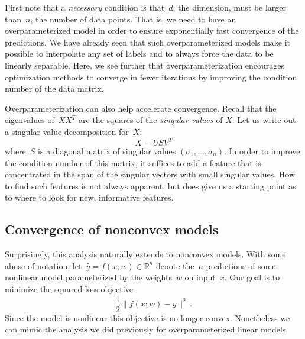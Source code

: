 \documentclass{tufte-book}
\begin{document}
First note that a \emph{necessary} condition is that~\(d\), the
dimension, must be larger than~\(n\), the number of data points. That
is, we need to have an overparameterized model in order to ensure
exponentially fast convergence of the predictions. We have already seen
that such overparameterized models make it possible to interpolate any
set of labels and to always force the data to be linearly separable.
Here, we see further that overparameterization encourages optimization
methods to converge in fewer iterations by improving the condition
number of the data matrix.

Overparameterization can also help accelerate convergence. Recall that
the eigenvalues of~\(XX^T\) are the squares of the \emph{singular
values} of \(X\). Let us write out a singular value decomposition
for~\(X\): \[
    X = USV^T
\] where~\(S\) is a diagonal matrix of singular values
\((\sigma_1,\ldots, \sigma_n)\). In order to improve the condition
number of this matrix, it suffices to add a feature that is concentrated
in the span of the singular vectors with small singular values. How to
find such features is not always apparent, but does give us a starting
point as to where to look for new, informative features.

\hypertarget{convergence-of-nonconvex-models}{%
\subsection{Convergence of nonconvex
models}\label{convergence-of-nonconvex-models}}


Surprisingly, this analysis naturally extends to nonconvex models. With
some abuse of notation, let~\(\hat y = f(x;w)\in\mathbb{R}^n\) denote
the~\(n\) predictions of some nonlinear model parameterized by the
weights~\(w\) on input~\(x\). Our goal is to minimize the squared loss
objective \[
\frac12\|f(x;w)-y\|^2\,.
\] Since the model is nonlinear this objective is no longer convex.
Nonetheless we can mimic the analysis we did previously for
overparameterized linear models.
\end{document}
